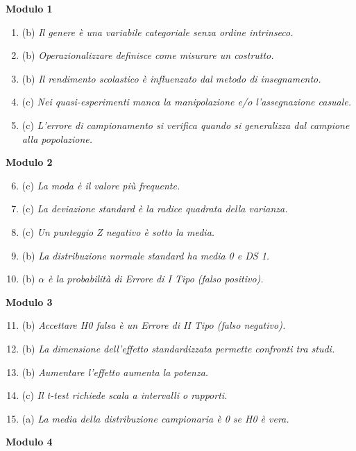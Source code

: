 \documentclass[12pt, a4paper]{article}
\begin{document}
\begin{footnotesize}
\begin{multicols}{2}
\textbf{Modulo 1}
\begin{enumerate}
    \item (b) \textit{Il genere è una variabile categoriale senza ordine intrinseco.}
    \item (b) \textit{Operazionalizzare definisce come misurare un costrutto.}
    \item (b) \textit{Il rendimento scolastico è influenzato dal metodo di insegnamento.}
    \item (c) \textit{Nei quasi-esperimenti manca la manipolazione e/o l'assegnazione casuale.}
    \item (c) \textit{L'errore di campionamento si verifica quando si generalizza dal campione alla popolazione.}
\end{enumerate}
\vspace{0.5cm}
\textbf{Modulo 2}
\begin{enumerate}
    \setcounter{enumi}{5}
    \item (c) \textit{La moda è il valore più frequente.}
    \item (c) \textit{La deviazione standard è la radice quadrata della varianza.}
    \item (c) \textit{Un punteggio Z negativo è sotto la media.}
    \item (b) \textit{La distribuzione normale standard ha media 0 e DS 1.}
    \item (b) \textit{$\alpha$ è la probabilità di Errore di I Tipo (falso positivo).}
\end{enumerate}
\vspace{0.5cm}
\textbf{Modulo 3}
\begin{enumerate}
    \setcounter{enumi}{10}
    \item (b) \textit{Accettare H0 falsa è un Errore di II Tipo (falso negativo).}
    \item (b) \textit{La dimensione dell'effetto standardizzata permette confronti tra studi.}
    \item (b) \textit{Aumentare l'effetto aumenta la potenza.}
    \item (c) \textit{Il t-test richiede scala a intervalli o rapporti.}
    \item (a) \textit{La media della distribuzione campionaria è 0 se H0 è vera.}
\end{enumerate}
\columnbreak
\textbf{Modulo 4}
\begin{enumerate}

\end{enumerate}
\end{multicols}
\end{footnotesize}
\end{document}
